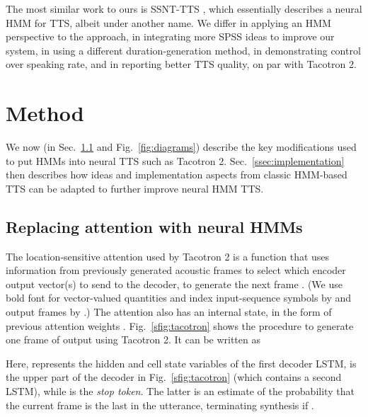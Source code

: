 \documentclass[british]{article}
\begin{document}
The most similar work to ours is SSNT-TTS \cite{yasuda2019initial}, which essentially describes a neural HMM for TTS, albeit under another name.
We differ in applying an HMM perspective to the approach, in integrating more SPSS ideas to improve our system, in using a different duration-generation method, in demonstrating control over speaking rate, and in reporting better TTS quality, on par with Tacotron 2.

\section{Method}
\label{sec:method}
We now (in Sec.\ \ref{ssec:neuralhmm} and Fig.\ \ref{fig:diagrams}) describe the key modifications used to put HMMs into neural TTS such as Tacotron 2.
Sec.\ \ref{ssec:implementation} then describes how ideas and implementation aspects from classic HMM-based TTS can be adapted to further improve neural HMM TTS.
\begin{figure*}[!t]
  \centering
  \hfill
  \caption{Synthesis-time architecture diagrams. Recurrences, delays, and the cumulative attention in Eq.\ \eqref{eq:decoder2} are drawn as grey arrows.}
\label{fig:diagrams}
  \vspace{-1\baselineskip}
\end{figure*}

\subsection{Replacing attention with neural HMMs}
\label{ssec:neuralhmm}
The location-sensitive attention \cite{chorowski2015attention} used by Tacotron 2 is a function that uses information from previously generated acoustic frames  to 
select which encoder output vector(s)  to send to the decoder, to generate the next frame .
(We use bold font for vector-valued quantities and index input-sequence symbols by  and output frames by .)
The attention also has an internal state, in the form of previous attention weights .
Fig.\ \ref{sfig:tacotron} shows the procedure to generate one frame  of output using Tacotron 2. It can be written as

Here,  represents the hidden and cell state variables of the first decoder LSTM,  is the upper part of the decoder in Fig.\ \ref{sfig:tacotron} (which contains a second LSTM), while  is the \emph{stop token}.
The latter is an estimate of the probability that the current frame is the last in the utterance, terminating synthesis if .
\end{document}
